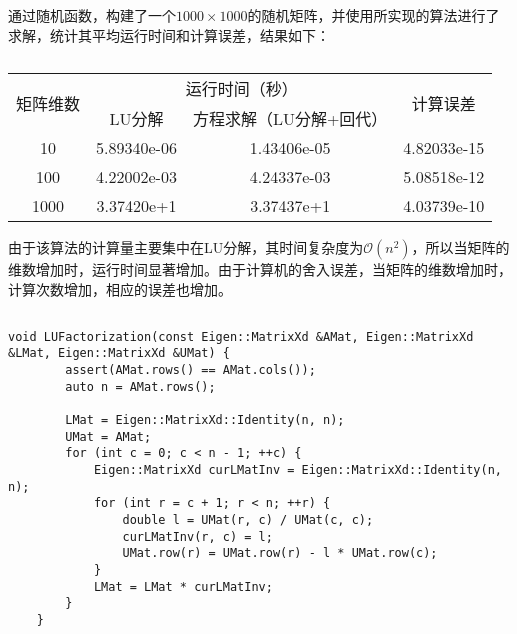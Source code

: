 \documentclass[12pt, onecolumn]{article}
\newcommand\normf{\fangsong}
\begin{document}
	\subsubsection{\normf{大型随机矩阵测试}}
	通过随机函数，构建了一个$1000\times 1000$的随机矩阵，并使用所实现的算法进行了求解，统计其平均运行时间和计算误差，结果如下：
	\begin{table}[h]
	\normf
	\centering
	\caption{\normf{测试结果}}
	\vspace{2mm}
	\begin{tabular}{c|ccc}
	\toprule
	\multirow{2}{*}{矩阵维数} & \multicolumn{2}{c}{运行时间（秒）} & \multirow{2}{*}{计算误差} \\ \cmidrule{2-3}
	                      & LU分解        & 方程求解（LU分解+回代） &                       \\ \midrule
	10                    & 5.89340e-06 & 1.43406e-05   & 4.82033e-15           \\
	100                   & 4.22002e-03 & 4.24337e-03   & 5.08518e-12           \\
	1000                  & 3.37420e+1  & 3.37437e+1    & 4.03739e-10           \\ \bottomrule
	\end{tabular}
	\end{table}
	
	由于该算法的计算量主要集中在LU分解，其时间复杂度为$\mathcal{O}(n^2)$，所以当矩阵的维数增加时，运行时间显著增加。由于计算机的舍入误差，当矩阵的维数增加时，计算次数增加，相应的误差也增加。
	
	\subsection{\normf{关键代码}}
	\begin{lstlisting}[caption=对矩阵$\boldsymbol{A}$的LU分解]
    void LUFactorization(const Eigen::MatrixXd &AMat, Eigen::MatrixXd &LMat, Eigen::MatrixXd &UMat) {
        assert(AMat.rows() == AMat.cols());
        auto n = AMat.rows();

        LMat = Eigen::MatrixXd::Identity(n, n);
        UMat = AMat;
        for (int c = 0; c < n - 1; ++c) {
            Eigen::MatrixXd curLMatInv = Eigen::MatrixXd::Identity(n, n);
            for (int r = c + 1; r < n; ++r) {
                double l = UMat(r, c) / UMat(c, c);
                curLMatInv(r, c) = l;
                UMat.row(r) = UMat.row(r) - l * UMat.row(c);
            }
            LMat = LMat * curLMatInv;
        }
    }
	\end{lstlisting}
	
\end{document}
